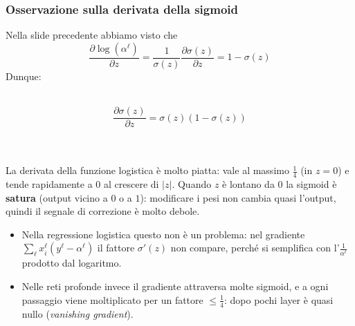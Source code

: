 \documentclass[a4paper,12pt]{article}
\begin{document}
\subsubsection{Osservazione sulla derivata della sigmoid}
Nella slide precedente abbiamo visto che
\[
\frac{\partial \log(\alpha^\ell)}{\partial z} = \frac{1}{\sigma(z)}\frac{\partial \sigma(z)}{\partial z} = 1 - \sigma(z)
\]
Dunque:\\
\vspace{1px}\\
\begin{minipage}[c]{0.42\textwidth}
\[
\frac{\partial \sigma(z)}{\partial z} = \sigma(z)\left(1 - \sigma(z)\right)
\]
\end{minipage}
\hfill
\begin{minipage}[c]{0.54\textwidth}
\centering
{}
\end{minipage}\\
\vspace{1px}\\
La derivata della funzione logistica è molto piatta: vale al massimo $\frac{1}{4}$ (in $z = 0$) e tende rapidamente a $0$ al crescere di $|z|$.
Quando $z$ è lontano da $0$ la sigmoid è \textbf{satura} (output vicino a $0$ o a $1$): modificare i pesi non cambia quasi l'output, quindi il segnale di correzione è molto debole.
\begin{itemize}
\item Nella regressione logistica questo non è un problema: nel gradiente $\sum_\ell x_i^\ell (y^\ell - \alpha^\ell)$ il fattore $\sigma'(z)$ non compare, perché si semplifica con l'$\frac{1}{\alpha^\ell}$ prodotto dal logaritmo.
\item Nelle reti profonde invece il gradiente attraversa molte sigmoid, e a ogni passaggio viene moltiplicato per un fattore $\le \frac{1}{4}$: dopo pochi layer è quasi nullo (\textit{vanishing gradient}).
\end{itemize}
\end{document}
